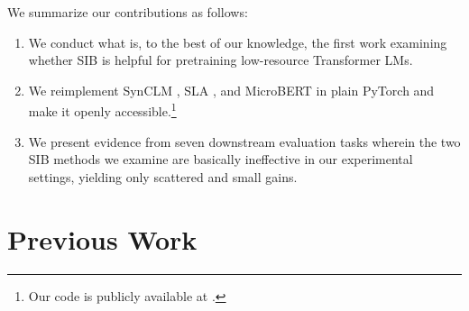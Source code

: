 \documentclass[11pt]{article}
\begin{document}
We summarize our contributions as follows:
\begin{enumerate}
\item We conduct what is, to the best of our knowledge, the first work examining whether SIB is helpful for pretraining low-resource Transformer LMs.
\item We reimplement SynCLM \citep{zhang-etal-2022-syntax}, SLA \citep{li-etal-2021-improving-bert}, and MicroBERT \citep{gessler-zeldes-2022-microbert} in plain PyTorch and make it openly accessible.\footnote{Our code is publicly available at \CodeRepo{}.}
\item We present evidence from seven downstream evaluation tasks wherein the two SIB methods we examine are basically ineffective in our experimental settings, yielding only scattered and small gains.
\end{enumerate}

\section{Previous Work}
\end{document}
